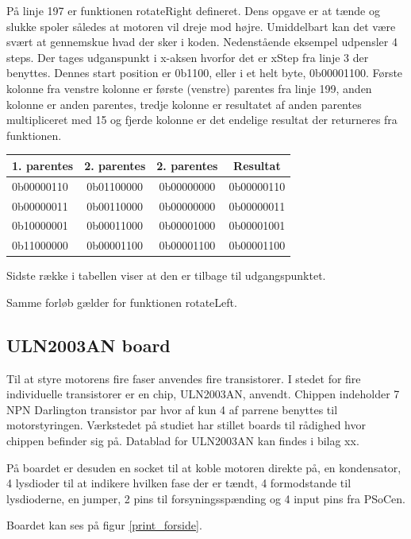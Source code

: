 På linje 197 er funktionen rotateRight defineret. Dens opgave er at tænde og slukke spoler således at motoren vil dreje mod højre. Umiddelbart kan det være svært at gennemskue hvad der sker i koden. Nedenstående eksempel udpensler 4 steps. Der tages udganspunkt i x-aksen hvorfor det er xStep fra linje 3 der benyttes. Dennes start position er 0b1100, eller i et helt byte, 0b00001100. Første kolonne fra venstre kolonne er første (venstre) parentes fra linje 199, anden kolonne er anden parentes, tredje kolonne er resultatet af anden parentes multipliceret med 15 og fjerde kolonne er det endelige resultat der returneres fra funktionen.

\begin{table}
\begin{tabular}{| l | c | c | c |}
1. parentes & 2. parentes & 2. parentes \bullet 15 & Resultat\\\hline
0b00000110 & 0b01100000 & 0b00000000 & 0b00000110\\\hline
0b00000011 & 0b00110000 & 0b00000000 & 0b00000011\\\hline
0b10000001 & 0b00011000 & 0b00001000 & 0b00001001\\\hline
0b11000000 & 0b00001100 & 0b00001100 & 0b00001100\\\hline
\end{tabular}
\end{table}

Sidste række i tabellen viser at den er tilbage til udgangspunktet.

Samme forløb gælder for funktionen rotateLeft.

\subsection{ULN2003AN board}
Til at styre motorens fire faser anvendes fire transistorer. I stedet for fire individuelle transistorer er en chip, ULN2003AN, anvendt. Chippen indeholder 7 NPN Darlington transistor par hvor af kun 4 af parrene benyttes til motorstyringen. Værkstedet på studiet har stillet boards til rådighed hvor chippen befinder sig på. Datablad for ULN2003AN kan findes i bilag xx.

På boardet er desuden en socket til at koble motoren direkte på, en kondensator, 4 lysdioder til at indikere hvilken fase der er tændt, 4 formodstande til lysdioderne, en jumper, 2 pins til forsyningsspænding og 4 input pins fra PSoCen.

Boardet kan ses på figur \ref{print_forside}.

